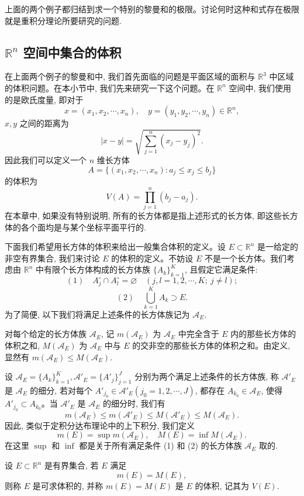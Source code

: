 上面的两个例子都归结到求一个特别的黎曼和的极限。讨论何时这种和式存在极限就是重积分理论所要研究的问题.

\subsection{\texorpdfstring{$\mathbb R^n$ 空间中集合的体积}{Rⁿ 空间中集合的体积}}
\label{subsec:ma-15-1-1}

在上面两个例子的黎曼和中, 我们首先面临的问题是平面区域的面积与 $\mathbb R^3$ 中区域的体积问题。在本小节中, 我们先来研究一下这个问题。在 $\mathbb R^n$ 空间中, 我们使用的是欧氏度量, 即对于
\[
  x=(x_1,x_2,\cdots,x_n),\quad y=(y_1,y_2,\cdots,y_n)\in\mathbb R^n,
\]
$x,y$ 之间的距离为
\[
  |x-y|=\sqrt{\sum_{j=1}^n(x_j-y_j)^2}.
\]
因此我们可以定义一个 $n$ 维长方体
\[
  A=\{(x_1,x_2,\cdots,x_n):a_j\leqslant x_j\leqslant b_j\}
\]
的体积为
\[
  V(A)=\prod_{j=1}^n(b_j-a_j).
\]
在本章中, 如果没有特别说明, 所有的长方体都是指上述形式的长方体, 即这些长方体的各个面均是与某个坐标平面平行的.

下面我们希望用长方体的体积来给出一般集合体积的定义。设 $E\subset\mathbb R^n$ 是一给定的非空有界集合, 我们来讨论 $E$ 的体积的定义。不妨设 $E$ 不是一个长方体。我们考虑由 $\mathbb R^n$ 中有限个长方体构成的长方体族 $\{A_k\}_{k=1}^K$, 且假定它满足条件:
\[
  (1)\quad A_j^\circ\cap A_l^\circ=\varnothing\quad (j,l=1,2,\cdots,K;\ j\ne l);
\]
\[
  (2)\quad \bigcup_{k=1}^K A_k\supset E.
\]
为了简便, 以下我们将满足上述条件的长方体族记为 $\mathcal A_E$.

对每个给定的长方体族 $\mathcal A_E$, 记 $m(\mathcal A_E)$ 为 $\mathcal A_E$ 中完全含于 $E$ 内的那些长方体的体积之和, $M(\mathcal A_E)$ 为 $\mathcal A_E$ 中与 $E$ 的交非空的那些长方体的体积之和。由定义, 显然有 $m(\mathcal A_E)\leqslant M(\mathcal A_E)$.

设 $\mathcal A_E=\{A_k\}_{k=1}^K,\mathcal A'_E=\{A'_j\}_{j=1}^J$ 分别为两个满足上述条件的长方体族, 称 $\mathcal A'_E$ 是 $\mathcal A_E$ 的细分, 若对每个 $A'_{j_0}\in\mathcal A'_E(j_0=1,2,\cdots,J)$, 都存在 $A_{k_0}\in\mathcal A_E$, 使得 $A'_{j_0}\subset A_{k_0}$。当 $\mathcal A'_E$ 是 $\mathcal A_E$ 的细分时, 我们有
\[
  m(\mathcal A_E)\leqslant m(\mathcal A'_E)\leqslant M(\mathcal A'_E)\leqslant M(\mathcal A_E).
\]
因此, 类似于定积分达布理论中的上下积分, 我们定义
\[
  m(E)=\sup m(\mathcal A_E),\quad M(E)=\inf M(\mathcal A_E).
\]
在这里 $\sup$ 和 $\inf$ 都是关于所有满足条件 (1) 和 (2) 的长方体族 $\mathcal A_E$ 取的.

\begin{definition}\label{definition:ma-15-1-1}
设 $E\subset\mathbb R^n$ 是有界集合, 若 $E$ 满足
\[
  m(E)=M(E),
\]
则称 $E$ 是可求体积的, 并称 $m(E)=M(E)$ 是 $E$ 的体积, 记其为 $V(E)$.
\end{definition}


